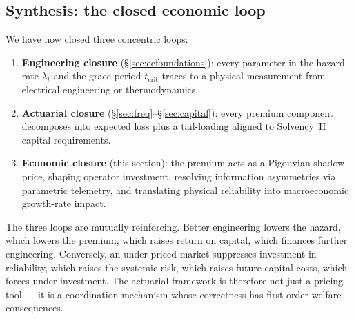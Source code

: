 \subsection{Synthesis: the closed economic loop}\label{ss:loop}

We have now closed three concentric loops:

\begin{enumerate}[leftmargin=*,nosep]
   \item \textbf{Engineering closure} (\S\ref{sec:eefoundations}):
         every parameter in the hazard rate $\lambda_t$ and the grace
         period $t_{\mathrm{crit}}$ traces to a physical measurement
         from electrical engineering or thermodynamics.
   \item \textbf{Actuarial closure} (\S\ref{sec:freq}--\S\ref{sec:capital}):
         every premium component decomposes into expected loss plus a
         tail-loading aligned to Solvency~II capital requirements.
   \item \textbf{Economic closure} (this section): the premium acts as
         a Pigouvian shadow price, shaping operator investment,
         resolving information asymmetries via parametric telemetry,
         and translating physical reliability into macroeconomic
         growth-rate impact.
\end{enumerate}
The three loops are mutually reinforcing. Better engineering lowers
the hazard, which lowers the premium, which raises return on
capital, which finances further engineering. Conversely, an
under-priced market suppresses investment in reliability, which
raises the systemic risk, which raises future capital costs, which
forces under-investment. The actuarial framework is therefore not
just a pricing tool --- it is a coordination mechanism whose
correctness has first-order welfare consequences.

